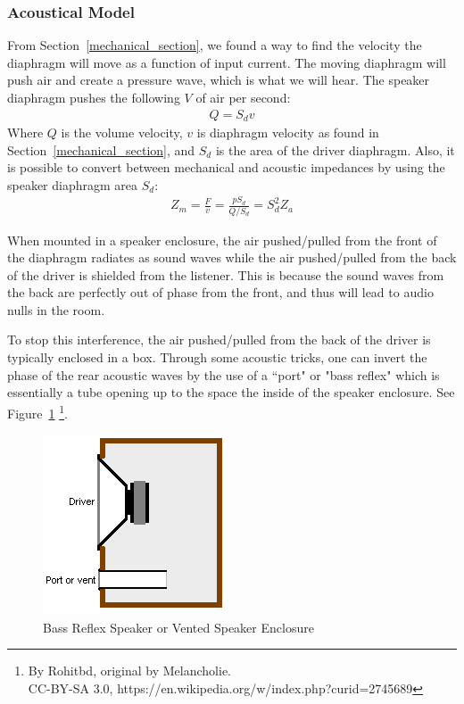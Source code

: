 \documentclass[10pt,letterpaper]{article}
\begin{document}
\subsubsection{Acoustical Model}\label{sec:acoustic_model}
From Section~\ref{mechanical_section}, we found a way to find the velocity the diaphragm will move as a function of input current. The moving diaphragm will push air and create a pressure wave, which is what we will hear. The speaker diaphragm pushes the following $V$ of air per second:
\begin{align}
Q=S_dv\label{eq:volume_velocity}
\end{align}
Where $Q$ is the volume velocity, $v$ is diaphragm velocity as found in Section~\ref{mechanical_section}, and $S_d$ is the area of the driver diaphragm. Also, it is possible to convert between mechanical and acoustic impedances by using the speaker diaphragm area $S_d$:
\begin{align}
Z_m=\frac{F}{v}=\frac{pS_d}{Q/S_d}= S_d^2 Z_a\label{eq:acoustic-to-mech_imp}
\end{align}

When mounted in a speaker enclosure, the air pushed/pulled from the front of the diaphragm radiates as sound waves while the air pushed/pulled from the back of the driver is shielded from the listener. This is because the sound waves from the back are perfectly out of phase from the front, and thus will lead to audio nulls in the room.

To stop this interference, the air pushed/pulled from the back of the driver is typically enclosed in a box. Through some acoustic tricks, one can invert the phase of the rear acoustic waves by the use of a ``port" or "bass reflex" which is essentially a tube opening up to the space the inside of the speaker enclosure. See Figure~\ref{bass_reflex} \footnote{By Rohitbd, original by Melancholie.\\
CC-BY-SA 3.0, https://en.wikipedia.org/w/index.php?curid=2745689}.

\begin{figure}
\centering
\includegraphics[height=0.25\textheight]{Bass_reflex_spk.png}
\caption{Bass Reflex Speaker or Vented Speaker Enclosure}\label{bass_reflex}
\end{figure}
\end{document}
